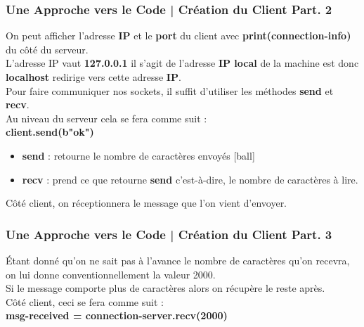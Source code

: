\documentclass[handout]{beamer}
\begin{document}
	\begin{frame}
	\frametitle{Une Approche vers le Code | Création du Client Part. 2}
	On peut afficher l'adresse {\bfseries IP} et le {\bfseries port} du client avec {\bfseries 	print(connection-info)} du côté du serveur.\newline \\
	L'adresse IP vaut {\bfseries 127.0.0.1} il s'agit de l'adresse {\bfseries IP local} de la machine 		est donc {\bfseries localhost} redirige vers cette adresse {\bfseries IP}.\newline \\
	Pour faire communiquer nos sockets, il suffit d'utiliser les méthodes {\bfseries send} 		et {\bfseries recv}.\newline \\
	Au niveau du serveur cela se fera comme suit :\newline \\
	{\bfseries client.send(b"ok")}
	\begin{itemize}
		\item {\bfseries send} : retourne le nombre de caractères envoyés
		\item {\bfseries recv} : prend ce que retourne {\bfseries send} c'est-à-dire, le 			nombre de caractères à lire.
	\end{itemize}	
	Côté client, on réceptionnera le message que l'on vient d'envoyer.
	\end{frame}	


	\begin{frame}
	\frametitle{Une Approche vers le Code | Création du Client Part. 3}
	Étant donné qu'on ne sait pas à l'avance le nombre de caractères qu'on recevra, on lui donne conventionnellement la valeur 2000.\\ Si le message comporte plus de caractères 		alors on récupère le reste après.\newline \\
	Côté client, ceci se fera comme suit :\\
	{\bfseries 	msg-received  = connection-server.recv(2000)}
	\end{frame}
\end{document}
